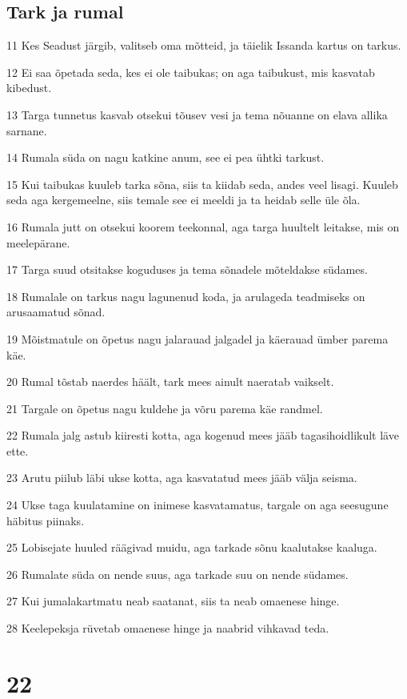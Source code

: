 \section*{Tark ja rumal}

\par 11 Kes Seadust järgib, valitseb oma mõtteid, ja täielik Issanda kartus on tarkus.
\par 12 Ei saa õpetada seda, kes ei ole taibukas; on aga taibukust, mis kasvatab kibedust.
\par 13 Targa tunnetus kasvab otsekui tõusev vesi ja tema nõuanne on elava allika sarnane.
\par 14 Rumala süda on nagu katkine anum, see ei pea ühtki tarkust.
\par 15 Kui taibukas kuuleb tarka sõna, siis ta kiidab seda, andes veel lisagi. Kuuleb seda aga kergemeelne, siis temale see ei meeldi ja ta heidab selle üle õla.
\par 16 Rumala jutt on otsekui koorem teekonnal, aga targa huultelt leitakse, mis on meelepärane.
\par 17 Targa suud otsitakse koguduses ja tema sõnadele mõteldakse südames.
\par 18 Rumalale on tarkus nagu lagunenud koda, ja arulageda teadmiseks on arusaamatud sõnad.
\par 19 Mõistmatule on õpetus nagu jalarauad jalgadel ja käerauad ümber parema käe.
\par 20 Rumal tõstab naerdes häält, tark mees ainult naeratab vaikselt.
\par 21 Targale on õpetus nagu kuldehe ja võru parema käe randmel.
\par 22 Rumala jalg astub kiiresti kotta, aga kogenud mees jääb tagasihoidlikult läve ette.
\par 23 Arutu piilub läbi ukse kotta, aga kasvatatud mees jääb välja seisma.
\par 24 Ukse taga kuulatamine on inimese kasvatamatus, targale on aga seesugune häbitus piinaks.
\par 25 Lobisejate huuled räägivad muidu, aga tarkade sõnu kaalutakse kaaluga.
\par 26 Rumalate süda on nende suus, aga tarkade suu on nende südames.
\par 27 Kui jumalakartmatu neab saatanat, siis ta neab omaenese hinge.
\par 28 Keelepeksja rüvetab omaenese hinge ja naabrid vihkavad teda.

\chapter{22}

